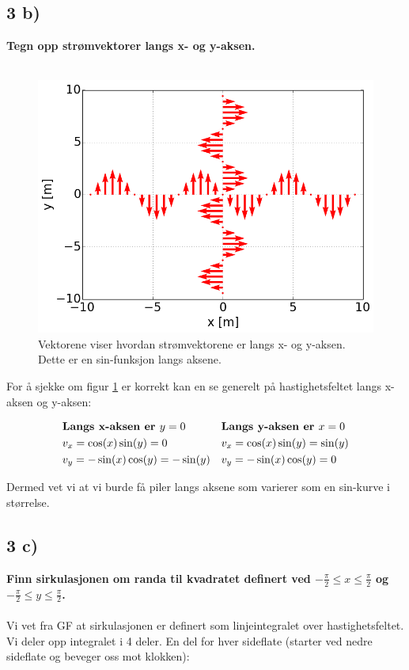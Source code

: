 \pagebreak
\subsection*{3 b)}
\textbf{Tegn opp strømvektorer langs x- og y-aksen.}
\\
\\
\begin{figure}[H]
		\centering
		\includegraphics[width=0.7\linewidth]{../3b.png}
		\caption{Vektorene viser hvordan strømvektorene
        er langs x- og y-aksen. Dette er en sin-funksjon langs aksene.}
		\label{fig_3b}
\end{figure}



For å sjekke om figur \ref{fig_3b} er korrekt kan en se generelt
på hastighetsfeltet langs x-aksen og y-aksen:


\begin{align*}
    &\textbf{Langs x-aksen er $ y = 0$}
    &&\textbf{Langs y-aksen er $ x = 0$}
    \\
    &v_x = \cos(x)\sin(y) = 0
    &&v_x = \cos(x)\sin(y) = \sin(y)
    \\
    &v_y = - \sin(x)\cos(y) = -\sin(y)
    &&v_y = - \sin(x)\cos(y) = 0
\end{align*}

Dermed vet vi at vi burde få piler langs aksene som varierer
som en sin-kurve i størrelse.










\pagebreak
\subsection*{3 c)}

\textbf{Finn sirkulasjonen om randa til kvadratet
definert ved $-\frac{\pi}{2} \leq x \leq \frac{\pi}{2}$ og
$-\frac{\pi}{2} \leq y \leq \frac{\pi}{2}$.}
\\
\\
Vi vet fra GF at sirkulasjonen er definert som linjeintegralet
 over hastighetsfeltet. Vi deler opp integralet i 4 deler. En del for
 hver sideflate (starter ved nedre sideflate og beveger oss mot klokken):

